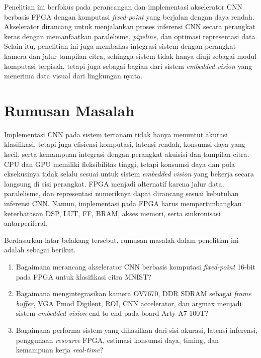 Penelitian ini berfokus pada perancangan dan implementasi akselerator CNN berbasis
FPGA dengan komputasi \emph{fixed-point} yang berjalan dengan daya
rendah. Akselerator dirancang untuk menjalankan
proses inferensi CNN secara perangkat keras dengan memanfaatkan
paralelisme, \emph{pipeline}, dan optimasi representasi data.
Selain itu, penelitian ini juga membahas integrasi sistem dengan
perangkat kamera dan jalur tampilan citra, sehingga sistem tidak
hanya diuji sebagai modul komputasi terpisah, tetapi juga sebagai
bagian dari sistem \emph{embedded vision} yang menerima data visual
dari lingkungan nyata.

\section{Rumusan Masalah}
Implementasi CNN pada sistem tertanam tidak hanya menuntut akurasi klasifikasi,
tetapi juga efisiensi komputasi, latensi rendah, konsumsi daya yang kecil, serta
kemampuan integrasi dengan perangkat akuisisi dan tampilan citra. CPU dan GPU
memiliki fleksibilitas tinggi, tetapi konsumsi daya dan pola eksekusinya tidak
selalu sesuai untuk sistem \emph{embedded vision} yang bekerja secara langsung
di sisi perangkat. FPGA menjadi alternatif karena jalur data, paralelisme, dan
representasi numeriknya dapat dirancang sesuai kebutuhan inferensi CNN. Namun,
implementasi pada FPGA harus mempertimbangkan keterbatasan DSP, LUT, FF, BRAM,
akses memori, serta sinkronisasi antarperiferal.

Berdasarkan latar belakang tersebut, rumusan masalah dalam penelitian ini adalah
sebagai berikut.
\begin{enumerate}
\item Bagaimana merancang akselerator CNN berbasis komputasi \emph{fixed-point} 16-bit pada FPGA untuk klasifikasi citra MNIST?
\item Bagaimana mengintegrasikan kamera OV7670, DDR SDRAM sebagai \emph{frame buffer}, VGA Pmod Digilent, ROI, CNN accelerator, dan argmax menjadi sistem \emph{embedded vision} end-to-end pada board Arty A7-100T?
\item Bagaimana performa sistem yang dihasilkan dari sisi akurasi, latensi inferensi, penggunaan \emph{resource} FPGA, estimasi konsumsi daya, timing, dan kemampuan kerja \emph{real-time}?
\end{enumerate}


